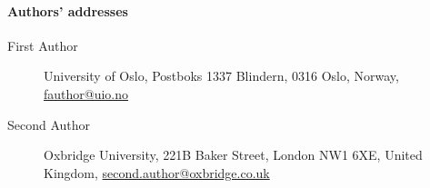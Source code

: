 \paragraph{Authors' addresses}
\begin{description}
    \item[First Author]
    University of Oslo,
    Postboks 1337 Blindern, 0316 Oslo, Norway,
    \href{mailto:fauthor@uio.no}{fauthor@uio.no}

    \item[Second Author]
    Oxbridge University,
    221B Baker Street, London NW1 6XE, United Kingdom,
    \href{mailto:second.author@oxbridge.co.uk}{second.author@oxbridge.co.uk}
\end{description}